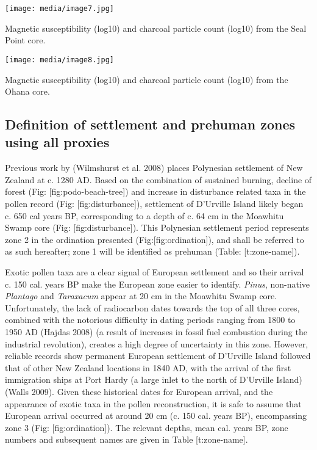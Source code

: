\documentclass[]{article}
\begin{document}
\texttt{[image: media/image7.jpg]}

Magnetic susceptibility (log10) and charcoal particle count (log10) from the Seal Point core.

\texttt{[image: media/image8.jpg]}

Magnetic susceptibility (log10) and charcoal particle count (log10) from the Ohana core.

\subsection{Definition of settlement and prehuman zones using all proxies}\label{definition-of-settlement-and-prehuman-zones-using-all-proxies}

Previous work by (Wilmshurst et al. 2008) places Polynesian settlement of New Zealand at c. 1280 AD. Based on the combination of sustained burning, decline of forest (Fig: {[}fig:podo-beach-tree{]}) and increase in disturbance related taxa in the pollen record (Fig: {[}fig:disturbance{]}), settlement of D'Urville Island likely began c. 650 cal years BP, corresponding to a depth of c. 64 cm in the Moawhitu Swamp core (Fig: {[}fig:disturbance{]}). This Polynesian settlement period represents zone 2 in the ordination presented (Fig:{[}fig:ordination{]}), and shall be referred to as such hereafter; zone 1 will be identified as prehuman (Table: {[}t:zone-name{]}).

Exotic pollen taxa are a clear signal of European settlement and so their arrival c. 150 cal. years BP make the European zone easier to identify. \emph{Pinus}, non-native \emph{Plantago} and \emph{Taraxacum} appear at 20 cm in the Moawhitu Swamp core. Unfortunately, the lack of radiocarbon dates towards the top of all three cores, combined with the notorious difficulty in dating periods ranging from 1800 to 1950 AD (Hajdas 2008) (a result of increases in fossil fuel combustion during the industrial revolution), creates a high degree of uncertainty in this zone. However, reliable records show permanent European settlement of D'Urville Island followed that of other New Zealand locations in 1840 AD, with the arrival of the first immigration ships at Port Hardy (a large inlet to the north of D'Urville Island) (Walls 2009). Given these historical dates for European arrival, and the appearance of exotic taxa in the pollen reconstruction, it is safe to assume that European arrival occurred at around 20 cm (c. 150 cal. years BP), encompassing zone 3 (Fig: {[}fig:ordination{]}). The relevant depths, mean cal. years BP, zone numbers and subsequent names are given in Table {[}t:zone-name{]}.
\end{document}
